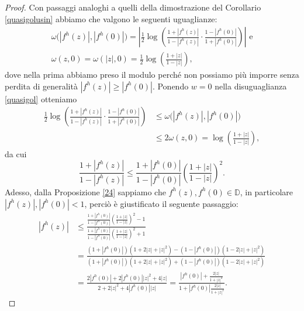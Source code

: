 \begin{proof}
  Con passaggi analoghi a quelli della dimostrazione del Corollario \ref{quasigolusin} abbiamo che valgono le seguenti uguaglianze:
  \begin{gather*}
    \omega\bigl(|f^h(z)|,|f^h(0)|\bigr)=\left|\frac{1}{2}\log\left(\frac{1+|f^h(z)|}{1-|f^h(z)|}\cdot\frac{1-|f^h(0)|}{1+|f^h(0)|}\right)\right|\text{ e}\\
    \omega(z, 0)=\omega(|z|,0)=\frac{1}{2}\log\left(\frac{1+|z|}{1-|z|}\right),
  \end{gather*}
  dove nella prima abbiamo preso il modulo perché non possiamo più imporre senza perdita di generalità $|f^h(z)| \ge |f^h(0)|$. Ponendo $w=0$ nella disuguaglianza \eqref{quasigol} otteniamo
  \begin{align*}
    \frac{1}{2}\log\left(\frac{1+|f^h(z)|}{1-|f^h(z)|}\cdot\frac{1-|f^h(0)|}{1+|f^h(0)|}\right) & \le \omega\bigl(|f^h(z)|,|f^h(0)|\bigr) \\
    & \le 2\omega(z,0)=\log\left(\frac{1+|z|}{1-|z|}\right),
  \end{align*}
  da cui
  \begin{equation}
    \frac{1+|f^h(z)|}{1-|f^h(z)|} \le \frac{1+|f^h(0)|}{1-|f^h(0)|}\left(\frac{1+|z|}{1-|z|}\right)^2. \label{golprimo}
  \end{equation}
  Adesso, dalla Proposizione \ref{24} sappiamo che $f^h(z),f^h(0) \in \mathbb{D}$, in particolare $|f^h(z)|,|f^h(0)|<1$, perciò è giustificato il seguente passaggio:
  \begin{align*}
    |f^h(z)| & \le \frac{\frac{1+|f^h(0)|}{1-|f^h(0)|}\left(\frac{1+|z|}{1-|z|}\right)^2-1}{\frac{1+|f^h(0)|}{1-|f^h(0)|}\left(\frac{1+|z|}{1-|z|}\right)^2+1} \\
    & =\frac{(1+|f^h(0)|)(1+2|z|+|z|^2)-(1-|f^h(0)|)(1-2|z|+|z|^2)}{(1+|f^h(0)|)(1+2|z|+|z|^2)+(1-|f^h(0)|)(1-2|z|+|z|^2)} \\
    & =\frac{2|f^h(0)|+2|f^h(0)||z|^2+4|z|}{2+2|z|^2+4|f^h(0)||z|}=\frac{|f^h(0)|+\frac{2|z|}{1+|z|^2}}{1+|f^h(0)|\frac{2|z|}{1+|z|^2}}.
  \end{align*}
\end{proof}
